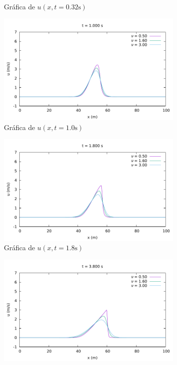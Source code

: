 \documentclass[12pt]{article}
\begin{document}
\begin{figure}[ht]
\begin{subfigure}{0.4\textwidth}
			\caption*{Gráfica de $u(x,t=0.32\unit{\second})$}
			\label{fig:vis1ddf3}
		\end{subfigure}\hfill
		\begin{subfigure}{0.4\textwidth}
			\centering
			\includegraphics[width=\textwidth]{../burg-vis1DDF/results/frame050.pdf}
			\caption*{Gráfica de $u(x,t=1.0\unit{\second})$}
			\label{fig:vis1ddf4}
		\end{subfigure}\par
		\begin{subfigure}{0.4\textwidth}
			\centering
			\includegraphics[width=\textwidth]{../burg-vis1DDF/results/frame090.pdf}
			\caption*{Gráfica de $u(x,t=1.8\unit{\second})$}
			\label{fig:vis1ddf5}
		\end{subfigure}\hfill
		\begin{subfigure}{0.4\textwidth}
			\centering
			\includegraphics[width=\textwidth]{../burg-vis1DDF/results/frame190.pdf}

\end{subfigure}
\end{figure}
\end{document}
